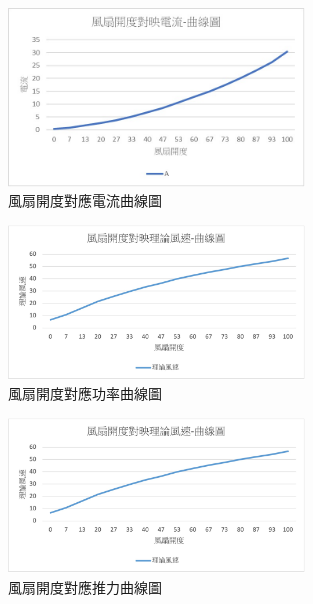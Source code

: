 \documentclass[12pt]{article}       %
\begin{document}
\begin{figure}[H]
    \centering
    \includegraphics[width=0.7\textwidth]{29.jpg}     %
    \caption{風扇開度對應電流曲線圖}    %
    \label{fig:29}    %
\end{figure}

\begin{figure}[H]
    \centering
    \includegraphics[width=0.7\textwidth]{28.jpg}     %
    \caption{風扇開度對應功率曲線圖}    %
    \label{fig:30}    %
\end{figure}

\begin{figure}[H]
    \centering
    \includegraphics[width=0.7\textwidth]{28.jpg}     %
    \caption{風扇開度對應推力曲線圖}    %
    \label{fig:31}    %
\end{figure}
\end{document}
